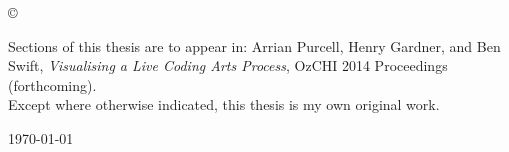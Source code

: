 
\vspace*{14cm}
\begin{center}
  \makeatletter
  \copyright\ \@author
  \makeatother
\end{center}
\noindent
\begin{center}
\end{center}
\noindent

\newpage

\vspace*{7cm}


\begin{center}
	Sections of this thesis are to appear in: Arrian Purcell, Henry Gardner, and Ben Swift, \textit{Visualising a Live Coding Arts Process}, OzCHI 2014 Proceedings (forthcoming).\\
	\vspace*{10mm}
	Except where otherwise indicated, this thesis is my own original work.
\end{center}

\vspace*{4cm}

\hspace{8cm}\makeatletter\@author\makeatother\par
\hspace{8cm}\today
